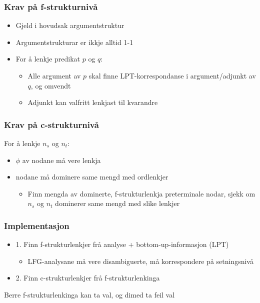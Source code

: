 \documentclass[bigger]{beamer}
\begin{document}
\begin{frame}\frametitle{Krav på f-strukturnivå}
  \begin{itemize}
  \item Gjeld i hovudsak argumentstruktur
  

  \item Argumentstrukturar er ikkje alltid 1-1
  
  \item For å lenkje predikat $p$ og $q$:
    \begin{itemize}
    \item Alle argument av $p$ skal finne LPT-korrespondanse i
      argument/adjunkt av $q$, og omvendt
    \item Adjunkt kan valfritt lenkjast til kvarandre
    \end{itemize}
  \end{itemize}
\end{frame}

\begin{frame}\frametitle{Krav på c-strukturnivå}
  For å lenkje $n_s$ og $n_t$:
  \begin{itemize}
  \item $\phi$ av nodane må vere lenkja
  \item nodane må dominere same mengd med ordlenkjer
    \begin{itemize}
    \item Finn mengda av dominerte, f-strukturlenkja preterminale
      nodar, sjekk om $n_s$ og $n_t$ dominerer same mengd med slike
      lenkjer
    \end{itemize}
  \end{itemize}
\end{frame}


\begin{frame}\frametitle{Implementasjon}
  \begin{itemize}
  \item 1. Finn f-strukturlenkjer frå analyse + bottom-up-informasjon (LPT)
    \begin{itemize}
    \item LFG-analysane må vere disambiguerte, må korrespondere på setningsnivå 
    \end{itemize}
  \item 2. Finn c-strukturlenkjer frå f-strukturlenkinga
  \end{itemize}

  Berre f-strukturlenkinga kan ta val, og dimed ta feil val
\end{frame}
\end{document}

